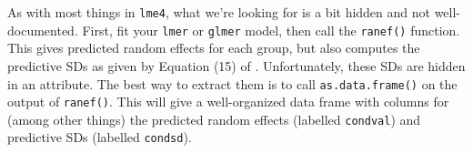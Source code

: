 \documentclass{article}
\begin{document}
As with most things in \texttt{lme4}, what we're looking for is a bit hidden and not well-documented. First, fit your \texttt{lmer} or \texttt{glmer} model, then call the \texttt{ranef()} function. This gives predicted random effects for each group, but also computes the predictive SDs as given by Equation (15) of \citeauthor{Boo98}. Unfortunately, these SDs are hidden in an attribute. The best way to extract them is to call \texttt{as.data.frame()} on the output of \texttt{ranef()}. This will give a well-organized data frame with columns for (among other things) the predicted random effects (labelled \texttt{condval}) and predictive SDs (labelled \texttt{condsd}).







\end{document}
